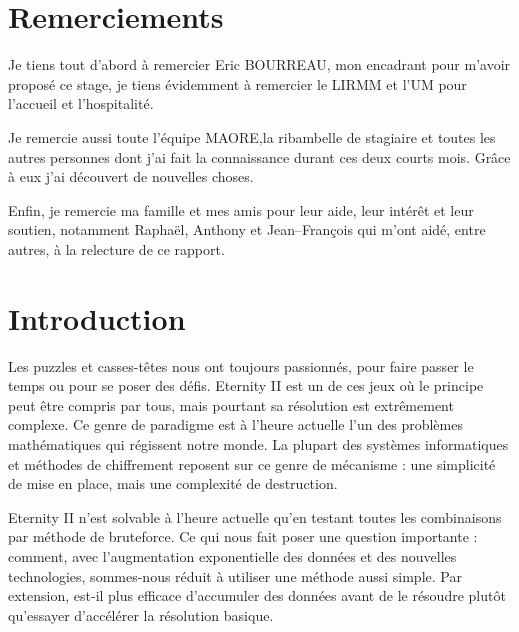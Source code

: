 \documentclass{article}
\begin{document}
	\renewcommand{\labelitemi}{$\bullet$}
	\renewcommand{\labelitemii}{$\--$}
	\renewcommand{\labelitemiii}{$\diamond$}
	\renewcommand{\labelitemiv}{$\ast$}

	\newcommand{\HRule}{\rule{\linewidth}{0.5mm}}


	
	\newpage

	\thispagestyle{empty}
	\null
	\newpage
	
	\setcounter{page}{1}
	\tableofcontents
	\newpage
	
	\listoffigures
	\newpage
	
	\listoftables
	\newpage
	\thispagestyle{empty}
	\section*{Remerciements}
	Je tiens tout d'abord à remercier Eric BOURREAU, mon encadrant pour m'avoir proposé ce stage, je tiens évidemment à remercier le LIRMM et l'UM pour l'accueil et l'hospitalité. 
	
	Je remercie aussi toute l'équipe MAORE,la ribambelle de stagiaire et toutes les autres personnes dont j'ai fait la connaissance durant ces deux courts mois. Grâce à eux j'ai découvert de nouvelles choses.
	
	Enfin, je remercie ma famille et mes amis pour leur aide, leur intérêt et leur soutien, notamment Raphaël, Anthony et Jean--François qui m'ont aidé, entre autres, à la relecture de ce rapport.
	\newpage

	\section{Introduction}

	Les puzzles et casses-têtes nous ont toujours passionnés, pour faire passer le temps ou pour se poser des défis. Eternity II est un de ces jeux où le principe peut être compris par tous, mais pourtant sa résolution est extrêmement complexe. Ce genre de paradigme est à l'heure actuelle l'un des problèmes mathématiques qui régissent notre monde. La plupart des systèmes informatiques et méthodes de chiffrement reposent sur ce genre de mécanisme : une simplicité de mise en place, mais une complexité de destruction.

	Eternity II n'est solvable à l'heure actuelle qu'en testant toutes les combinaisons par méthode de bruteforce. Ce qui nous fait poser une question importante : comment, avec l'augmentation exponentielle des données et des nouvelles technologies, sommes-nous réduit à utiliser une méthode aussi simple. Par extension, est-il plus efficace d'accumuler des données avant de le résoudre plutôt qu'essayer d'accélérer la résolution basique.
\end{document}
